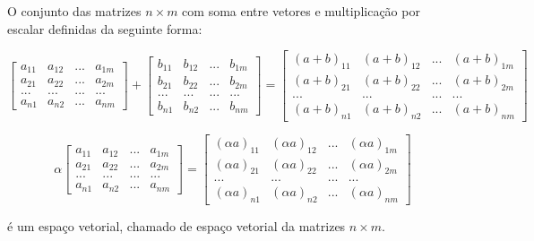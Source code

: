 \documentclass[../main.tex]{subfiles}
\begin{document}
		\begin{exemplo}
			O conjunto das matrizes $n\times m$ com soma entre vetores e multiplicação por escalar definidas da seguinte forma:
			\begin{description}
					\item \[
					\begin{bmatrix}
						a_{11} & a_{12} & ... & a_{1m}  \\
						a_{21} & a_{22} & ... & a_{2m} \\
						... & ... & ... & ... \\
						a_{n1} & a_{n2} & ... & a_{nm}
					\end{bmatrix} + \begin{bmatrix}
					b_{11} & b_{12} & ... & b_{1m}  \\
					b_{21} & b_{22} & ... & b_{2m} \\
					... & ... & ... & ... \\
					b_{n1} & b_{n2} & ... & b_{nm}
					\end{bmatrix} = \begin{bmatrix}
					(a+b)_{11} & (a+b)_{12} & ... & (a+b)_{1m}  \\
					(a+b)_{21} & (a+b)_{22} & ... & (a+b)_{2m} \\
					... & ... & ... & ... \\
					(a+b)_{n1} & (a+b)_{n2} & ... & (a+b)_{nm}
					\end{bmatrix}
					\]
					\item \[\alpha \begin{bmatrix}
						a_{11} & a_{12} & ... & a_{1m}  \\
						a_{21} & a_{22} & ... & a_{2m} \\
						... & ... & ... & ... \\
						a_{n1} & a_{n2} & ... & a_{nm}
					\end{bmatrix} = \begin{bmatrix}
					(\alpha a)_{11} & (\alpha a)_{12} & ... & (\alpha a)_{1m}  \\
					(\alpha a)_{21} & (\alpha a)_{22} & ... & (\alpha a)_{2m} \\
					... & ... & ... & ... \\
					(\alpha a)_{n1} & (\alpha a)_{n2} & ... & (\alpha a)_{nm}
					\end{bmatrix}
					\]
			\end{description}
			é um espaço vetorial, chamado de espaço vetorial da matrizes $n\times m$.
		\end{exemplo} \bigskip
\end{document}

